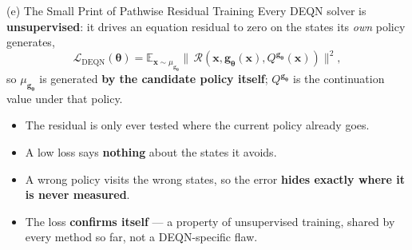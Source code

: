 \documentclass[aspectratio=169,11pt]{beamer}
\newcommand{\lemph}[1]{{\color{uzhblue}\bfseries #1}}
\newcommand{\param}{{\bm{\theta}}}
\newcommand{\policy}{{\bm{g}}}
\newcommand{\state}{{\bm{x}}}
\newcommand{\resid}{\mathcal{R}}
\begin{document}
\begin{frame}{(e) The Small Print of Pathwise Residual Training}
\vspace{0.4em}
{\footnotesize Every DEQN solver is \lemph{unsupervised}: it drives an equation
residual to zero on the states its \emph{own} policy generates,}
\[
  \mathcal L_{\mathrm{DEQN}}(\param)=
  \mathbb{E}_{\state\sim\mu_{\policy_\param}}
  \bigl\|\,\resid\!\left(\state,\policy_\param(\state),Q^{\policy_\param}(\state)\right)\bigr\|^2 ,
\]
{\footnotesize so $\mu_{\policy_\param}$ is generated \lemph{by the candidate
policy itself}; $Q^{\policy_\param}$ is the continuation value under that policy.}
\vspace{0.5em}
\begin{itemize}\setlength\itemsep{4pt}\footnotesize
  \item The residual is only ever tested where the current policy already goes.
  \item A low loss says \lemph{nothing} about the states it avoids.
  \item A wrong policy visits the wrong states, so the error \lemph{hides exactly
        where it is never measured}.
  \item The loss \lemph{confirms itself} --- a property of unsupervised training,
        shared by every method so far, not a DEQN-specific flaw.
\end{itemize}
\end{frame}
\end{document}
